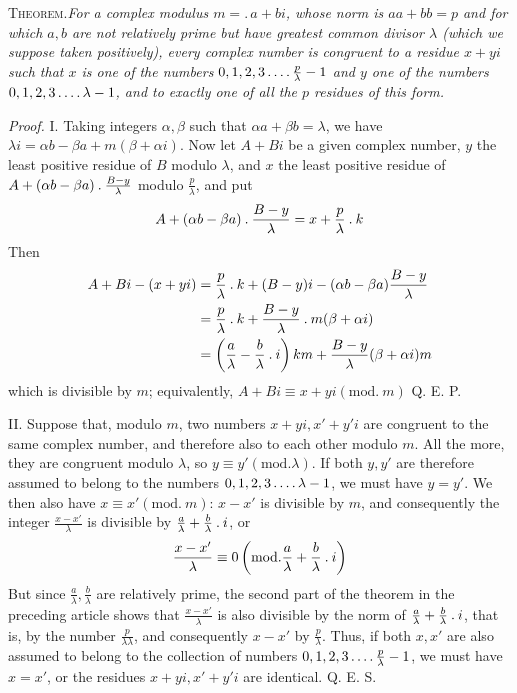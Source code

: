 \newpage
{}
\textsc{Theorem.}\quad\emph{For a complex modulus $m=.\,a+bi$, whose norm is $aa+bb=p$ and for which $a,b$ are not relatively prime but have greatest common divisor $\lambda$ (which we suppose taken positively), every complex number is congruent to a residue $x+yi$ such that $x$ is one of the numbers $0,1,2,3\mathinner{.\,.\,.\,.}\frac p\lambda-1$ and $y$ one of the numbers $0,1,2,3\mathinner{.\,.\,.\,.}\lambda-1$, and to exactly one of all the $p$ residues of this form.}

%
\emph{Proof.} I. Taking integers $\alpha,\beta$ such that $\alpha a+\beta b=\lambda$, we have $\lambda i=\alpha b-\beta a+m(\beta+\alpha i)$. Now let $A+Bi$ be a given complex number, $y$ the least positive residue of $B$ modulo $\lambda$, and $x$ the least positive residue of $A+(\alpha b-\beta a)\mathbin{.}\frac{B-y}{\lambda}$ modulo $\frac p\lambda$, and put
\[
A+(\alpha b-\beta a)\mathbin{.}\frac{B-y}{\lambda}=x+\frac p\lambda\mathbin{.} k
\]
Then
\[
\begin{aligned}
A+Bi-(x+yi)&=\frac p\lambda\mathbin{.} k+(B-y)i-(\alpha b-\beta a)\frac{B-y}{\lambda}\\
&=\frac p\lambda\mathbin{.} k+\frac{B-y}{\lambda}\mathbin{.} m(\beta+\alpha i)\\
&=\left(\frac a\lambda-\frac b\lambda\mathbin{.} i\right)km+\frac{B-y}{\lambda}(\beta+\alpha i)m
\end{aligned}
\]
which is divisible by $m$; equivalently, $A+Bi\equiv x+yi(\mathrm{mod.}\ m)$ Q. E. P.

II. Suppose that, modulo $m$, two numbers $x+yi,x'+y'i$ are congruent to the same complex number, and therefore also to each other modulo $m$. All the more, they are congruent modulo $\lambda$, so $y\equiv y'(\mathrm{mod.}\lambda)$. If both $y,y'$ are therefore assumed to belong to the numbers $0,1,2,3\mathinner{.\,.\,.\,.}\lambda-1$, we must have $y=y'$. We then also have $x\equiv x'(\mathrm{mod.}\ m)$: $x-x'$ is divisible by $m$, and consequently the integer $\frac{x-x'}\lambda$ is divisible by $\frac a\lambda+\frac b\lambda\mathbin{.} i$, or
\[
\frac{x-x'}\lambda\equiv0\left(\mathrm{mod.}\frac a\lambda+\frac b\lambda\mathbin{.} i\right)
\]
But since $\frac a\lambda,\frac b\lambda$ are relatively prime, the second part of the theorem in the preceding article shows that $\frac{x-x'}\lambda$ is also divisible by the norm of $\frac a\lambda+\frac b\lambda\mathbin{.} i$, that is, by the number $\frac p{\lambda\lambda}$, and consequently $x-x'$ by $\frac p\lambda$. Thus, if both $x,x'$ are also assumed to belong to the collection of numbers $0,1,2,3\mathinner{.\,.\,.\,.}\frac p\lambda-1$, we must have $x=x'$, or the residues $x+yi,x'+y'i$ are identical. Q. E. S.

